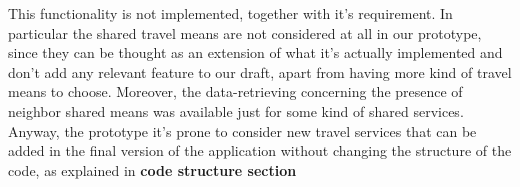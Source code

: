 This functionality is not implemented, together with it's requirement. In particular the shared travel means are not considered at all in our prototype, since they can be thought as an extension of what it's actually implemented and don't add any relevant feature to our draft, apart from having more kind of travel means to choose. Moreover, the data-retrieving concerning the presence of neighbor shared means was available just for some kind of shared services. 
Anyway, the prototype it's prone to consider new travel services that can be added in the final version of the application without changing the structure of the code, as explained in \textbf{code structure section}
